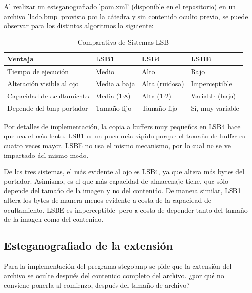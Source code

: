 Al realizar un esteganografiado 'pom.xml' (disponible en el repositorio) en un archivo 'lado.bmp' provisto por la cátedra y sin contenido oculto previo, se puede observar para los distintos algoritmos lo siguiente:

\begin{table}[H]
\centering
\caption{Comparativa de Sistemas LSB}
\label{comparativa-lsb}
\begin{tabular}{l|l|l|l}
\textbf{Ventaja}          & \textbf{LSB1} & \textbf{LSB4}  & \textbf{LSBE}    \\ \hline \hline
Tiempo de ejecución       & Medio         & Alto           & Bajo             \\  \hline
Alteración visible al ojo & Media a baja  & Alta (ruidosa) & Imperceptible    \\  \hline
Capacidad de ocultamiento & Media (1:8)   & Alta (1:2)     & Variable (baja)  \\  \hline
Depende del bmp portador  & Tamaño fijo   & Tamaño fijo    & Sí, muy variable \\  \hline
\end{tabular}
\end{table}

Por detalles de implementación, la copia a buffers muy pequeños en LSB4 hace que sea el más lento. LSB1 es un poco más rápido porque el tamaño de buffer es cuatro veces mayor. LSBE no usa el mismo mecanismo, por lo cual no se ve impactado del mismo modo.

De los tres sistemas, el más evidente al ojo es LSB4, ya que altera más bytes del portador. Asimismo, es el que más capacidad de almacenaje tiene, que sólo depende del tamaño de la imagen y no del contenido. De manera similar, LSB1 altera los bytes de manera menos evidente a costa de la capacidad de ocultamiento. LSBE es imperceptible, pero a costa de depender tanto del tamaño de la imagen como del contenido.

\subsection{Esteganografiado de la extensión}

\begin{displayquote}
Para la implementación del programa stegobmp se pide que la extensión del archivo se oculte
después del contenido completo del archivo. ¿por qué no conviene ponerla al comienzo,
después del tamaño de archivo?
\end{displayquote}

